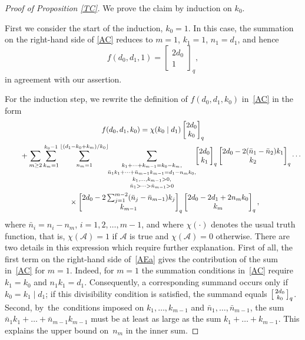 \documentclass[pdftex]{sigma}
\def\fl#1{\lfloor#1\rfloor}
\begin{document}
\begin{proof}[Proof of Proposition \ref{TC}]
We prove the claim by induction on $k_0$.

First we consider the start of the induction, $k_0=1$.
In this case, the summation on  the right-hand side of \eqref{AC} reduces to
$m=1$,  $k_1=1$, $n_1=d_1$, and hence
\begin{equation*}
f(d_0,d_1,1)=\begin{bmatrix} 2d_0\\1\end{bmatrix}_q,
\end{equation*}
in agreement with our assertion.

For the induction step, we rewrite the definition of $f(d_0,d_1,k_0)$
in~\eqref{AC} in the form
\begin{gather}
f(d_0,d_1,k_0)=
\chi(k_0\mid d_1)\begin{bmatrix} 2d_0\\k_0\end{bmatrix}_q
\nonumber\\ \qquad{}
+\sum_{m\ge2}\sum_{k_m=1}^{k_0-1}\sum_{n_m=1}^{\fl{(d_1-k_0+k_m)/k_0}}
\kern-3pt
\underset{\bar n_1>\dots>\bar n_{m-1}>0}
{
\underset{k_1,\dots,k_{m-1}>0,}
{
\underset{\bar n_1k_1+\dots+\bar n_{m-1}k_{m-1}=d_1-n_mk_0,}
{\sum_{k_1+\dots+k_{m-1}=k_0-k_m,}}}}
\kern-3pt
\begin{bmatrix} 2d_0\\k_1\end{bmatrix}_q
\begin{bmatrix} 2d_0-2(\bar n_1-\bar n_2)k_1\\k_2\end{bmatrix}_q
\cdots\nonumber\\ \qquad\quad{}
\times
\begin{bmatrix} 2d_0-2\sum_{j=1}^{m-2}(\bar n_j-\bar n_{m-1})k_j\\k_{m-1}\end{bmatrix}_q
\begin{bmatrix} 2d_0-2d_1+2n_mk_0\\k_m\end{bmatrix}_q,
\label{AEa}
\end{gather}
where $\bar n_i=n_i-n_m$, $i=1,2,\dots,m-1$, and where $\chi(\cdot)$
denotes the usual truth function, that is, $\chi(\mathcal A)=1$ if
$\mathcal A$ is true and $\chi(\mathcal A)=0$ otherwise.
There are two details in this expression which require further
explanation. First of all, the first term on the right-hand side
of~\eqref{AEa} gives the contribution of the sum in~\eqref{AC} for $m=1$.
Indeed, for $m=1$ the summation conditions in~\eqref{AC} require
$k_1=k_0$ and $n_1k_1=d_1$. Consequently, a corresponding summand
occurs only if $k_0=k_1\mid d_1$; if this divisibility condition
is satisfied, the summand equals $\bigl[\smallmatrix
2d_0\\k_0\endsmallmatrix\bigr]_q$. Second, by~the~conditions imposed
on $k_1,\dots,k_{m-1}$ and $\bar n_1,\dots,\bar n_{m-1}$, the sum
$\bar n_1k_1+\dots+\bar n_{m-1}k_{m-1}$ must be at least as large
as the sum $k_1+\dots+k_{m-1}$. This explains the upper bound on~$n_m$
in the inner sum.


\end{proof}
\end{document}
